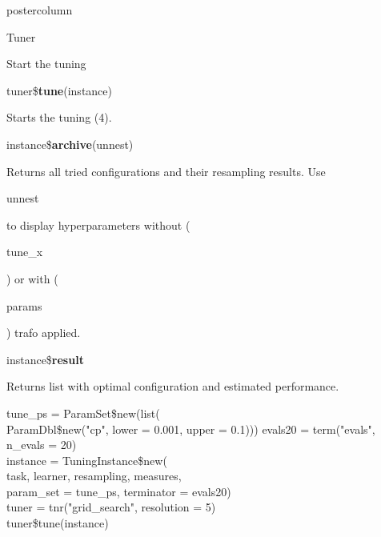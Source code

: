 \documentclass{beamer}
\newcommand{\codeinline}[1]{\begin{codeboxinline}#1\end{codeboxinline}}
\begin{document}
\begin{frame}[fragile]{}
\begin{columns}
\begin{column}{.245\textwidth}
\begin{beamercolorbox}[center]{postercolumn}
\begin{minipage}{.98\textwidth}
{\begin{myblock}{Tuner}
						\end{myblock}
						\begin{myblock}{Start the tuning}
							\begin{codebox}
								tuner\$\textbf{tune}(instance)
							\end{codebox}
							Starts the tuning (4).
							\\
							\begin{codebox}
								instance\$\textbf{archive}(unnest)
							\end{codebox}
							Returns all tried configurations and their resampling results. Use \codeinline{unnest} to display hyperparameters without (\codeinline{tune\_x}) or with (\codeinline{params}) trafo applied.
							\\
							\begin{codebox}
								instance\$\textbf{result}
							\end{codebox}
							Returns list with optimal configuration and estimated performance.
							\\
							\begin{codeboxexample}
								\footnotesize{
									tune\_ps = ParamSet\$new(list(\\
									\hspace*{1ex} ParamDbl\$new("cp", lower = 0.001, upper = 0.1)))
									evals20 = term("evals", n\_evals = 20)
									\vspace{1em}
									\\
									instance = TuningInstance\$new(\\
									\hspace*{1ex} task, learner, resampling, measures,\\
									\hspace*{1ex} param\_set = tune\_ps, terminator = evals20)\\
									tuner = tnr("grid\_search", resolution = 5)
									\vspace{1em}
									\\
									tuner\$tune(instance)\\
}
\end{codeboxexample}
\end{myblock}}
\end{minipage}
\end{beamercolorbox}
\end{column}
\end{columns}
\end{frame}
\end{document}
